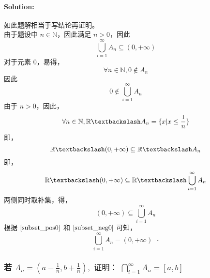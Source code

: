 \documentclass{article}
\begin{document}
\paragraph{Solution:}
如此题解相当于写结论再证明。\\
由于题设中 $n \in \mathbb{N}$，因此满足 $n > 0$，因此 
\begin{equation}
    \bigcup_{i = 1}^{\infty}A_n \subseteq (0, +\infty)
    \label{subset_pos0}
\end{equation}
对于元素 $0$，易得，
\begin{equation*}
    \forall n \in \mathbb{N}, 0 \notin A_n
\end{equation*}
因此
\begin{equation*}
    0 \notin \bigcup_{i = 1}^{\infty} A_n
\end{equation*}
由于 $n > 0$，因此，
\begin{equation*}
    \forall n \in \mathbb{N}, \mathbb{R} \textbackslash A_n = \{x|x \leq \frac{1}{n}\}
\end{equation*}
即，
\begin{equation*}
    \mathbb{R} \textbackslash (0, +\infty) \subseteq \mathbb{R} \textbackslash A_n
\end{equation*}
即，
\begin{equation*}
    \mathbb{R} \textbackslash (0, +\infty) \subseteq \mathbb{R} \textbackslash \bigcup_{i = 1}^{\infty} A_n
\end{equation*}
两侧同时取补集，得，
\begin{equation}
    (0, +\infty) \subseteq \bigcup_{i = 1}^{\infty} A_n
    \label{subset_neg0}
\end{equation}
根据 $\ref{subset_pos0}$ 和 $\ref{subset_neg0}$ 可知，
\begin{equation*}
    \bigcup_{i = 1}^{\infty}A_n = (0, +\infty) \text{ } \square
\end{equation*}
\subsubsection{若 $A_{n} = ( a - \frac{1}{n}, b + \frac{1}{n} ), \text{ 证明： } 
\bigcap_{i=1}^{\infty}A_n = [a, b]$}
\end{document}
